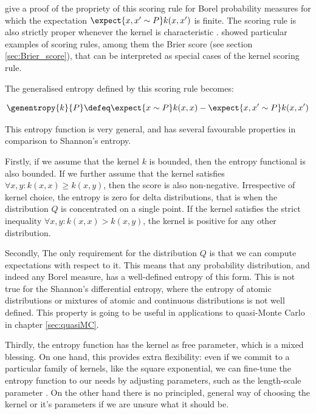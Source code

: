 \citep{Gneiting2007} give a proof of the propriety of this scoring rule for Borel probability measures for which the expectation $\expect{x,x'\sim P} k(x,x')$ is finite. The scoring rule is also strictly proper whenever the kernel is characteristic \citep{Sripedimbudur}. \citep{Gneiting2007} showed particular examples of scoring rules, among them the Brier score (see section \ref{sec:Brier_score}), that can be interpreted as special cases of the kernel scoring rule.

The generalised entropy defined by this scoring rule becomes:

\begin{equation}
	\genentropy{k}{P} \defeq \expect{x\sim P} k(x,x) - \expect{x,x'\sim P} k(x,x')
\end{equation}

This entropy function is very general, and has several favourable properties in comparison to Shannon's entropy.

Firstly, if we assume that the kernel $k$ is bounded, then the entropy functional is also bounded. If we further assume that the kernel satisfies $\forall x,y: k(x,x)\geq k(x,y)$, then the score is also non-negative. Irrespective of kernel choice, the entropy is zero for delta distributions, that is when the distribution $Q$ is concentrated on a single point. If the kernel satisfies the strict inequality $\forall x,y: k(x,x) > k(x,y)$, the kernel is positive for any other distribution.

Secondly, The only requirement for the distribution $Q$ is that we can compute expectations with respect to it. This means that any probability distribution, and indeed any Borel measure, has a well-defined entropy of this form. This is not true for the Shannon's differential entropy, where the entropy of atomic distributions or mixtures of atomic and continuous distributions is not well defined. This property is going to be useful in applications to quasi-Monte Carlo in chapter \ref{sec:quasiMC}.

Thirdly, the entropy function has the kernel as free parameter, which is a mixed blessing. On one hand, this provides extra flexibility: even if we commit to a particular family of kernels, like the square exponential, we can fine-tune the entropy function to our needs by adjusting parameters, such as the length-scale parameter \citep{tailoring}. On the other hand there is no principled, general way of choosing the kernel or it's parameters if we are unsure what it should be.

